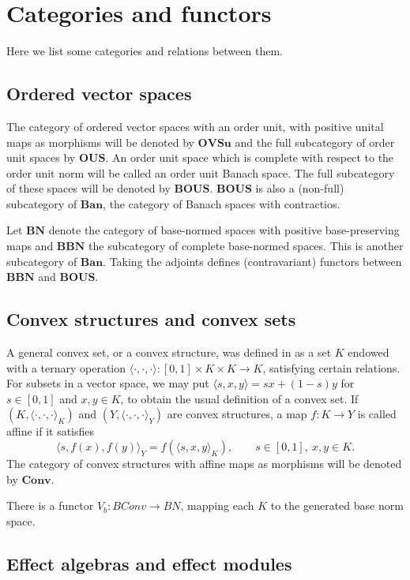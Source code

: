 \documentclass[12pt]{article}
\newcommand{\<}{\langle}
\def\>{\rangle}
\newcommand{\ct}[1]{\mathbf{#1}}
\begin{document}
\section{Categories and functors}

Here we list some categories and relations between them. 

\subsection{Ordered vector spaces}

The category of ordered vector spaces with an order unit, with positive unital maps as morphisms will be denoted by $\ct{OVSu}$ and the full subcategory of order unit 
spaces by  $\ct{OUS}$. An order unit space which is complete with respect to the order unit norm will be called an order unit Banach space. The full subcategory of these spaces will be denoted by $\ct{BOUS}$. $\ct{BOUS}$ is also a (non-full) subcategory of $\ct{Ban}$, the category of Banach spaces with contractios.


Let $\ct{BN}$ denote the category of base-normed spaces with positive base-preserving maps and $\ct{BBN}$ the subcategory of complete base-normed spaces. 
 This is another subcategory of $\ct{Ban}$. Taking the adjoints defines  (contravariant) functors between  $\ct{BBN}$ and $\ct{BOUS}$. 

\subsection{Convex structures and convex sets}

A general convex set, or a convex structure, was defined in \cite{gudder} as a set $K$ endowed with a ternary operation $\<\cdot,\cdot,\cdot\>: [0,1]\times K\times K\to K$,
 satisfying certain relations. For subsets in a vector space, we may put $\<s,x,y\>=sx+(1-s)y$ for $s\in [0,1]$ and $x,y\in K$, to obtain the usual definition of a convex set.  If $(K,\<\cdot,\cdot,\cdot\>_K)$ and $(Y,\<\cdot,\cdot,\cdot\>_Y)$ are convex structures, a map $f:K\to Y$ is called affine if it satisfies
\[
\<s,f(x),f(y)\>_Y=f(\<s,x,y\>_K),\qquad s\in [0,1],\ x,y\in K.
\]
The category of convex structures with affine maps as morphisms will be denoted by $\ct{Conv}$. 



There is a functor $V_b: BConv\to BN$, mapping each $K$ to the generated base norm space.  



\subsection{Effect algebras and effect modules}
\end{document}
